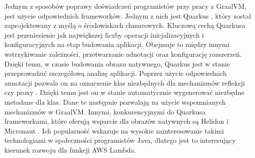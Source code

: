Jednym z sposobów poprawy doświadczeń programistów przy pracy z GraalVM, jest użycie odpowiednich frameworków.
Jednym z nich jest Quarkus \cite{9245290}, który został zaprojektowany z myślą o środowiskach chmurowych.
Kluczową cechą Quarkusa jest przeniesienie jak największej liczby operacji inicjalizacyjnych i konfiguracyjnych na etap budowania aplikacji.
Obejmuje to między innymi wstrzykiwanie zależności, przetwarzanie adnotacji oraz konfigurację rozszerzeń. 
Dzięki temu, w czasie budowania obrazu natywnego, Quarkus jest w stanie przeprowadzić szczegółową analizę aplikacji.
Poprzez użycie odpowiednich annotacji pozwala on na oznaczenie klas niezbędnych dla mechanizmów refleksji czy proxy \cite{quarkus-docs}.
Dzięki temu jest on w stanie automatycznie wygenerować niezbędne metadane dla klas.
Dane te następnie pozwalają na użycie wspomnianych mechanizmów w GraalVM.
Innymi, konkurencyjnymi do Quarkusa frameworkami, które oferują wsparcie dla obrazów natywnych są Helidon i Micronaut \cite{9245290}.
Ich popularność wskazuje na wysokie zainteresowanie takimi technologiami w społeczności programistów Java, dlatego jest to interesujący kierunek rozwoju dla funkcji AWS Lambda.
